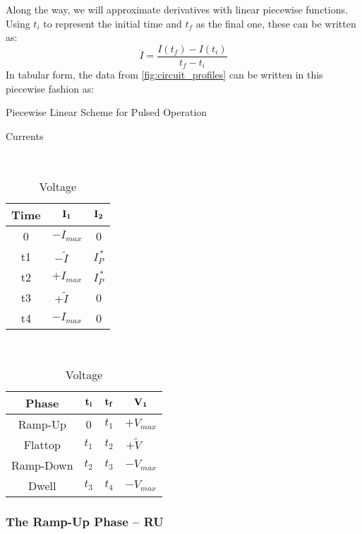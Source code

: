 Along the way, we will approximate derivatives with linear piecewise functions. Using $t_i$ to represent the initial time and $t_f$ as the final one, these can be written as:
\begin{equation}
	\dot I = \frac{ I(t_f) - I(t_i) }{t_f - t_i}
\end{equation}
In tabular form, the data from \cref{fig:circuit_profiles} can be written in this piecewise fashion as:

\begin{table}[h!]
\centering
\caption{Piecewise Linear Scheme for Pulsed Operation}
\hfill
\begin{subtable}[t]{0.4\textwidth}
\centering
\caption{Currents} ~\\
\begin{tabular}{ c|c|c }

\textbf{Time} & {$\bold{I_1}$} & {$\bold{I_2}$} \\
\hline
0 & $-I_{max}$ & 0 \\
t1 & $-\tilde I \ \ \ \,\, $ & $I_P^{\,*} $ \\
t2 & $+I_{max}$ & $I_P^{\,*}$ \\
t3 & $+\tilde I \ \ \ \,\, $ & 0 \\
t4 & $-I_{max}$ & 0 \\
\end{tabular}
\end{subtable}
\hfill
\begin{subtable}[t]{0.5\textwidth}
\centering
\caption{Voltage} ~\\
\begin{tabular}{ c|c|c|c }
\textbf{Phase} & $\bold{t_i}$ & $\bold{t_f}$ & $\bold{V_1}$ \\
\hline
Ramp-Up & 0 & $t_1$ & $+V_{max}$ \\
Flattop & $t_1$ & $t_2$ & $+ \tilde V$ \ \,\,\, \\
Ramp-Down & $t_2$ & $t_3$ & ${-V}_{max}$ \\
Dwell & $t_3$ & $t_4$ & ${-V}_{max}$ \\
\end{tabular}
\end{subtable}
\hfill
\hfill
\end{table}


\subsubsection{The Ramp-Up Phase -- RU}


